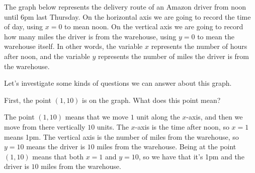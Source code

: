 \documentclass{ximera}
\begin{document}
\begin{example}
The graph below represents the delivery route of an Amazon driver from noon until 6pm 
last Thursday. On the horizontal axis we are going to record the time of day, using 
$x=0$ to mean noon. On the vertical axis we are going to record how many miles the 
driver is from the warehouse, using $y=0$ to mean the warehouse itself. In other words, 
the variable $x$ represents the number of hours after noon, and the variable $y$ represents 
the number of miles the driver is from the warehouse.
\begin{image}
\end{image}
Let's investigate some kinds of questions we can answer about this graph.

First, the point $(1,10)$ is on the graph. What does this point mean?
\begin{multipleChoice}
\begin{feedback}[correct]
The point $(1,10)$ means that we move $1$ unit along the $x$-axis, and then we move from there vertically $10$ units. The $x$-axis is the time after noon, so $x=1$ means 1pm. The vertical axis is the number of miles from the warehouse, so $y=10$ means the driver is $10$ miles from the warehouse. Being at the point $(1,10)$ means that both $x=1$ and $y=10$, so we have that it's 1pm and the driver is $10$ miles from the warehouse.
\end{feedback}
\end{multipleChoice}


\end{example}
\end{document}

